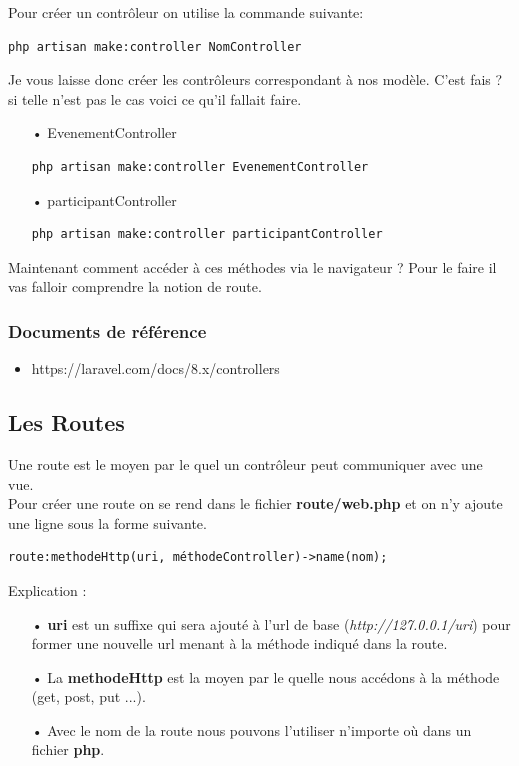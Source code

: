 \documentclass[12pt,a4paper]{article}
\begin{document}
Pour créer un contrôleur on utilise la commande suivante:
\begin{verbatim}
php artisan make:controller NomController
\end{verbatim}

Je vous laisse donc créer les contrôleurs correspondant à nos modèle. C'est fais ?
si telle n'est pas le cas voici ce qu'il fallait faire.

\begin{itemize}
\item[•] EvenementController
\begin{verbatim}
php artisan make:controller EvenementController
\end{verbatim}
\item[•] participantController
\begin{verbatim}
php artisan make:controller participantController
\end{verbatim}
\end{itemize}

Maintenant comment accéder à ces méthodes via le navigateur ? Pour le faire il vas falloir comprendre 
la notion de route.

\subsubsection{Documents de référence}
\begin{itemize}
\item https://laravel.com/docs/8.x/controllers
\end{itemize}

\subsection{Les Routes}
Une route est le moyen par le quel un contrôleur peut communiquer avec une vue.\\
Pour créer une route on se rend dans le fichier \textbf{route/web.php} et on n'y ajoute une ligne sous
la forme suivante.
\begin{verbatim}
route:methodeHttp(uri, méthodeController)->name(nom);
\end{verbatim}

Explication :
\begin{itemize}
\item[•] \textbf{uri} est un suffixe qui sera ajouté à l'url de base (\textit{http://127.0.0.1/uri}) pour former une nouvelle url menant à la méthode indiqué dans la route.
\item[•] La \textbf{methodeHttp} est la moyen par le quelle nous accédons à la méthode (get, post, put ...).
\item[•] Avec le nom de la route nous pouvons l'utiliser n'importe où dans un fichier \textbf{php}. 
\end{itemize}
\end{document}
